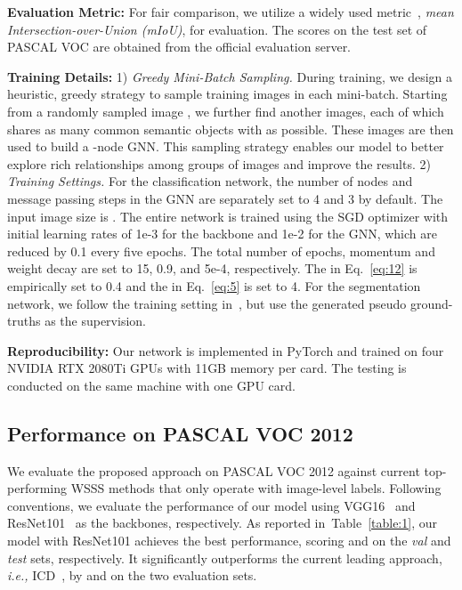 \documentclass[letterpaper]{article} \usepackage{aaai21}  \usepackage{times}  \usepackage{helvet} \usepackage{courier}  \usepackage[hyphens]{url}  \usepackage{graphicx} \urlstyle{rm} \def\UrlFont{\rm}  \usepackage{graphicx}  \usepackage{natbib}  \usepackage{caption} \frenchspacing  \setlength{\pdfpagewidth}{8.5in}  \setlength{\pdfpageheight}{11in}
\newcommand{\tabref}[1]{Table~\ref{#1}}
\newcommand{\ie}[1]{\textit{i.e.,}}
\begin{document}
\noindent\textbf{Evaluation Metric:} For fair comparison, we utilize a widely used metric~\cite{wang2018weakly,choe2019attention,sun2020mining}, \textit{mean Intersection-over-Union (mIoU)}, for evaluation. The scores on the test set of PASCAL VOC are obtained from the official evaluation server.


\noindent\textbf{Training Details:} 
1) \textit{Greedy Mini-Batch Sampling.} During training, we design a heuristic, greedy strategy to sample  training images in each mini-batch. Starting from a randomly sampled image , we further find another  images, each of which shares as many common semantic objects with  as possible. These  images are then used to build a -node GNN. This sampling strategy enables our model to better explore rich relationships among groups of images and improve the results.
2) \textit{Training Settings.} 
For the classification network, the number of nodes  and message passing steps  in the GNN are separately set to 4 and 3 by default. The input image size is . The entire network is trained using the SGD optimizer with initial learning rates of 1e-3 for the backbone and 1e-2 for the GNN, which are reduced by 0.1 every five epochs. The total number of epochs, momentum and weight decay are set to 15, 0.9, and 5e-4, respectively. The  in Eq.~\eqref{eq:12} is empirically set to 0.4 and the  in Eq.~\eqref{eq:5} is set to 4. For the segmentation network, we follow the training setting in~\cite{chen2017deeplab}, but use the generated pseudo ground-truths as the supervision.



\noindent\textbf{Reproducibility:} 
Our network is implemented in PyTorch and trained on four NVIDIA RTX 2080Ti GPUs with 11GB memory per card. The testing is conducted on the same machine with one GPU card. 

\subsection{Performance on PASCAL VOC 2012}
We evaluate the proposed approach on PASCAL VOC 2012 against current top-performing WSSS methods that only operate with image-level labels. Following conventions, we evaluate the performance of our model using VGG16~\cite{simonyan2014very} and ResNet101~\cite{he2016identity} as the backbones, respectively. As reported in~\tabref{table:1}, our model with ResNet101 achieves the best performance, scoring  and  on the \textit{val} and \textit{test} sets, respectively. It significantly outperforms the current leading approach, \ie, ICD~\cite{fan2020learning}, by  and  on the two evaluation sets. 
\end{document}
